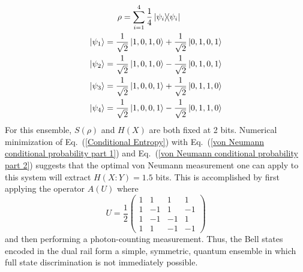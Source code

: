 \documentclass[aps,pra,twocolumn,showpacs,superscriptaddress,floatfix,10pt]{revtex4}
\begin{document}
\begin{eqnarray}
\rho  = \sum_{i=1}^4 \frac{1}{4} \outerproduct{\psi_i}{\psi_i} \quad \quad \quad \quad \quad \\
\ket{\psi_1} = \frac{1}{\sqrt{2}} \ket{1,0,1,0} + \frac{1}{\sqrt{2}} \ket{0,1,0,1} \\
\ket{\psi_2} = \frac{1}{\sqrt{2}} \ket{1,0,1,0} - \frac{1}{\sqrt{2}} \ket{0,1,0,1} \\
\ket{\psi_3} = \frac{1}{\sqrt{2}} \ket{1,0,0,1} + \frac{1}{\sqrt{2}} \ket{0,1,1,0} \\
\ket{\psi_4} = \frac{1}{\sqrt{2}} \ket{1,0,0,1} - \frac{1}{\sqrt{2}} \ket{0,1,1,0}
\end{eqnarray}
For this ensemble, $S(\rho)$ and $H(X)$ are both fixed at 2 bits. Numerical minimization of Eq.~(\ref{Conditional Entropy}) with Eq.~(\ref{von Neumann conditional probability part 1}) and Eq.~(\ref{von Neumann conditional probability part 2}) suggests that the optimal von Neumann measurement one can apply to this system will extract $H(X:Y) = 1.5$ bits. This is accomplished by first applying the operator $A(U)$ where
\begin{equation}
\label{First U}
U = \frac{1}{2} \begin{pmatrix} 1 & 1 & 1 & 1 \\ 1 & -1 & 1 & -1 \\ 1 & -1 & -1 & 1 \\ 1 & 1 & -1 & -1 \end{pmatrix}   
\end{equation}
and then performing a photon-counting measurement. Thus, the Bell states encoded in the dual rail form a simple, symmetric, quantum ensemble in which full state discrimination is not immediately possible. 
\end{document}
